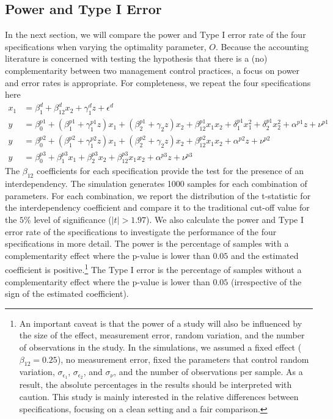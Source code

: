 \documentclass[12pt]{article}
\begin{document}
\subsection{Power and Type I Error}
In the next section, we will compare the power and Type I error rate of the four specifications when varying the optimality parameter, $O$. Because the accounting literature is concerned with testing the hypothesis that there is a (no) complementarity between two management control practices, a focus on power and error rates is appropriate. For completeness, we repeat the four specifications here
\begin{align*} 
x_1 &= \beta_1^d + \beta_{12}^d x_2 
        + \gamma_{1}^d z
        + \epsilon^d \\
y &=  \beta^{p1}_0 + (\beta^{p1}_{1} + \gamma_1^{p1} z )x_1 
						+ (\beta_{2}^{p1} + \gamma_2 z ) x_2 
                        + \beta_{12}^{p1} x_1 x_2 
                        + \delta_1^{p1} x^2_1 + \delta_2^{p1} x^2_2 
                        + \alpha^{p1} z
                        + \nu^{p1} \\
 y &=  \beta^{p2}_0 + (\beta^{p2}_{1} + \gamma_1^{p2} z )x_1 
						+ (\beta_{2}^{p2} + \gamma_2 z ) x_2 
                        + \beta_{12}^{p2} x_1 x_2 
                        + \alpha^{p2} z
                        + \nu^{p2} \\
 y &=  \beta^{p3}_0 + \beta^{p3}_{1} x_1 
						+ \beta_{2}^{p3} x_2 
                        + \beta_{12}^{p3} x_1 x_2 
                        + \alpha^{p3} z
                        + \nu^{p3}
\end{align*}
The $\beta_{12}$ coefficients for each specification provide the test for the presence of an interdependency. The simulation generates 1000 samples for each combination of parameters. For each combination, we report the distribution of the t-statistic for the interdependency coefficient and compare it to the traditional cut-off value for the $5\%$ level of significance ($|t| > 1.97$). We also calculate the power and Type I error rate of the specifications to investigate the performance of the four specifications in more detail. The power is the percentage of samples with a complementarity effect where the p-value is lower than $0.05$ and the estimated coefficient is positive.\footnote{An important caveat is that the power of a study will also be influenced by the size of the effect, measurement error, random variation, and the number of observations in the study. In the simulations, we assumed a fixed effect ($\beta_{12} = 0.25$), no measurement error, fixed the parameters that control random variation, $\sigma_{\epsilon_1}$, $\sigma_{\epsilon_2}$, and $\sigma_{\nu}$, and the number of observations per sample. As a result, the absolute percentages in the results should be interpreted with caution. This study is mainly interested in the relative differences between specifications, focusing on a clean setting and a fair comparison.} The Type I error is the percentage of samples without a complementarity effect where the p-value is lower than $0.05$ (irrespective of the sign of the estimated coefficient). 
\end{document}
